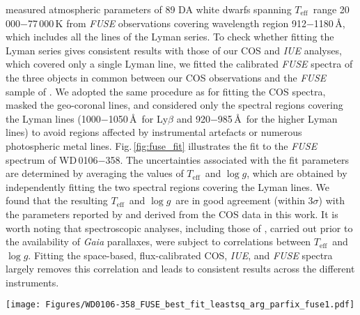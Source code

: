 \documentclass[fleqn,usenatbib, useAMS]{mnras}
\newcommand{\Teff}{\mbox{$T_{\mathrm{eff}}$}}
\newcommand{\logg}{\mbox{$\log g$}}
\begin{document}
\citet{Barstow2014} measured atmospheric parameters of 89 DA white dwarfs spanning \Teff\ range 20\,000$-$77\,000\,K from \textit{FUSE} observations covering wavelength region 912$-$1180\,\AA, which includes all the lines of the Lyman series. To check whether fitting the Lyman series gives consistent results with those of our COS and \textit{IUE} analyses, which covered only a single Lyman line, we fitted the calibrated \textit{FUSE} spectra of the three objects in common between our COS observations and the \textit{FUSE} sample of \citet{Barstow2014}. We adopted the same procedure as for fitting the COS spectra, masked the geo-coronal lines, and considered only the spectral regions covering the Lyman lines (1000$-$1050\,\AA\, for Ly$\beta$ and 920$-$985\,\AA\, for the higher Lyman lines) to avoid regions affected by instrumental artefacts or numerous photospheric metal lines. Fig.\,\ref{fig:fuse_fit} illustrates the fit to the \textit{FUSE} spectrum of WD\,0106$-$358. The uncertainties associated with the fit parameters are determined by averaging the values of \Teff\ and \logg, which are obtained by independently fitting the two spectral regions covering the Lyman lines. We found that the resulting \Teff\ and \logg\ are in good agreement (within 3$\sigma$) with the parameters reported by \citet{Barstow2014} and derived from the COS data in this work. It is worth noting that spectroscopic analyses, including those of \citet{Barstow2014}, carried out prior to the availability of \textit{Gaia} parallaxes, were subject to correlations between \Teff\ and \logg. Fitting the space-based, flux-calibrated COS, \textit{IUE}, and \textit{FUSE} spectra largely removes this correlation and leads to consistent results across the different instruments.

\begin{figure*}
\centering
\texttt{[image: Figures/WD0106-358\_FUSE\_best\_fit\_leastsq\_arg\_parfix\_fuse1.pdf]}
\caption{WD model fit (red solid line) to the \textit{FUSE} spectrum of WD\,0106$-$358. Only the spectral regions covering Lyman lines (shown in black) were included in the fit. The best-fit parameters obtained from the fitting are labeled in the left panel and shown as a blue square in the right panel. The parameters from \citet{Barstow2014} are shown as orange diamond on the left panel. Refer Fig.\,\ref{fig:spec_fit_wd_good} for more details on the labels.}
\label{fig:fuse_fit}
\end{figure*}
\end{document}
